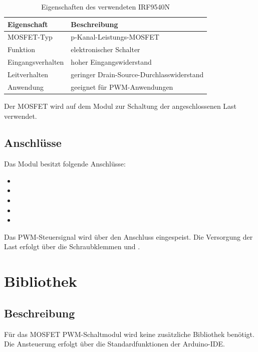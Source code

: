 \begin{table}[htbp]
	\centering
	\caption{Eigenschaften des verwendeten IRF9540N}
	\label{tab:mosfet_irf9540n}
	\begin{tabular}{ll}
		\hline
		\textbf{Eigenschaft} & \textbf{Beschreibung} \\
		\hline
		MOSFET-Typ & p-Kanal-Leistungs-MOSFET \\
		Funktion & elektronischer Schalter \\
		Eingangsverhalten & hoher Eingangswiderstand \\
		Leitverhalten & geringer Drain-Source-Durchlasswiderstand \\
		Anwendung & geeignet für PWM-Anwendungen \\
		\hline
	\end{tabular}
\end{table}

Der MOSFET wird auf dem Modul zur Schaltung der angeschlossenen Last verwendet.

\subsection{Anschlüsse}

Das Modul besitzt folgende Anschlüsse:

\begin{itemize}
	\item {}
	\item {}
	\item {}
	\item {}
	\item {}
\end{itemize}

Das PWM-Steuersignal wird über den Anschluss  eingespeist. 
Die Versorgung der Last erfolgt über die Schraubklemmen  und  \cite{JoyITMOSFET:2025}.

\section{Bibliothek}

\subsection{Beschreibung}

Für das MOSFET PWM-Schaltmodul wird keine zusätzliche Bibliothek benötigt. 
Die Ansteuerung erfolgt über die Standardfunktionen der Arduino-IDE.

